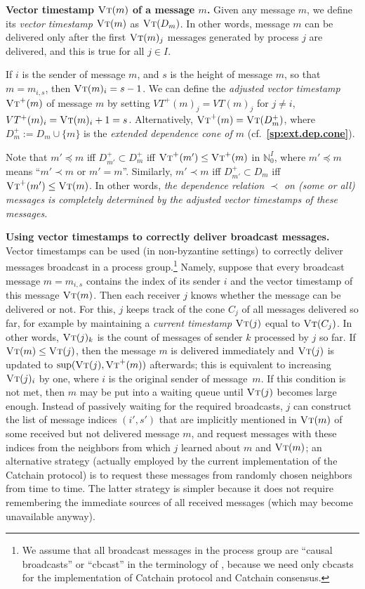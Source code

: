 \documentclass[12pt,oneside]{article}
\def\makepoint#1{\medbreak\noindent{\bf #1.\ }}
\def\nxsubpoint{\refstepcounter{subsubsection}%
  \smallbreak\makepoint{\thesubsubsection}}
\def\refpoint#1{{\rm\textbf{\ref{#1}}}}
\let\ptref=\refpoint
\def\emb#1{\textbf{#1.}}
\def\opsc#1{\operatorname{\textsc{#1}}}
\def\VT{\opsc{Vt}}
\def\bbN{{\mathbb{N}}}
\begin{document}
\nxsubpoint\emb{Vector timestamp $\VT(m)$ of a message $m$}
Given any message $m$, we define its {\em vector timestamp\/} $\VT(m)$ as $\VT(D_m)$. In other words, message $m$ can be delivered only after the first $\VT(m)_j$ messages generated by process $j$ are delivered, and this is true for all $j\in I$.

If $i$ is the sender of message $m$, and $s$ is the height of message $m$, so that $m=m_{i,s}$, then $\VT(m)_i=s-1$. We can define the {\em adjusted vector timestamp\/} $\VT^+(m)$ of message $m$ by setting $VT^+(m)_j=VT(m)_j$ for $j\neq i$, $VT^+(m)_i=\VT(m)_i+1=s$. Alternatively, $\VT^+(m)=\VT(D^+_m)$, where $D^+_m:=D_m\cup\{m\}$ is the {\em extended dependence cone of $m$} (cf.~\ptref{sp:ext.dep.cone}).

Note that $m'\preceq m$ iff $D^+_{m'}\subset D^+_m$ iff $\VT^+(m')\leq\VT^+(m)$ in $\bbN_0^I$, where $m'\preceq m$ means ``$m'\prec m$ or $m'=m$''. Similarly, $m'\prec m$ iff $D^+_{m'}\subset D_m$ iff $\VT^+(m')\leq\VT(m)$. In other words, {\em the dependence relation $\prec$ on (some or all) messages is completely determined by the adjusted vector timestamps of these messages.}

\nxsubpoint\emb{Using vector timestamps to correctly deliver broadcast messages}
Vector timestamps can be used (in non-byzantine settings) to correctly deliver messages broadcast in a process group.\footnote{We assume that all broadcast messages in the process group are ``causal broadcasts'' or ``cbcast'' in the terminology of \cite{Birman}, because we need only cbcasts for the implementation of Catchain protocol and Catchain consensus.} Namely, suppose that every broadcast message $m=m_{i,s}$ contains the index of its sender $i$ and the vector timestamp of this message $\VT(m)$. Then each receiver $j$ knows whether the message can be delivered or not. For this, $j$ keeps track of the cone $C_j$ of all messages delivered so far, for example by maintaining a {\em current timestamp} $\VT(j)$ equal to $\VT(C_j)$. In other words, $\VT(j)_k$ is the count of messages of sender $k$ processed by $j$ so far. If $\VT(m)\leq\VT(j)$, then the message $m$ is delivered immediately and $\VT(j)$ is updated to $\sup(\VT(j),\VT^+(m))$ afterwards; this is equivalent to increasing $\VT(j)_i$ by one, where $i$ is the original sender of message~$m$. If this condition is not met, then $m$ may be put into a waiting queue until $\VT(j)$ becomes large enough. Instead of passively waiting for the required broadcasts, $j$ can construct the list of message indices $(i',s')$ that are implicitly mentioned in $\VT(m)$ of some received but not delivered message $m$, and request messages with these indices from the neighbors from which $j$ learned about $m$ and $\VT(m)$; an alternative strategy (actually employed by the current implementation of the Catchain protocol) is to request these messages from randomly chosen neighbors from time to time. The latter strategy is simpler because it does not require remembering the immediate sources of all received messages (which may become unavailable anyway).
\end{document}
